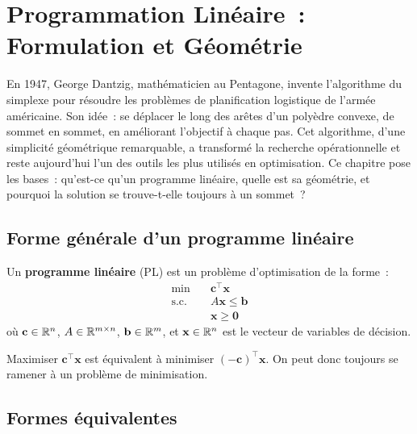 \chapter{Programmation Lin\'eaire~: Formulation et G\'eom\'etrie}
\label{ch:programmation_lineaire}

En 1947, George Dantzig, math\'ematicien au Pentagone, invente l'algorithme
du simplexe pour r\'esoudre les probl\`emes de planification logistique de
l'arm\'ee am\'ericaine. Son id\'ee~: se d\'eplacer le long des ar\^etes d'un
poly\`edre convexe, de sommet en sommet, en am\'eliorant l'objectif \`a chaque
pas. Cet algorithme, d'une simplicit\'e g\'eom\'etrique remarquable, a
transform\'e la recherche op\'erationnelle et reste aujourd'hui l'un des
outils les plus utilis\'es en optimisation. Ce chapitre pose les bases~:
qu'est-ce qu'un programme lin\'eaire, quelle est sa g\'eom\'etrie, et pourquoi
la solution se trouve-t-elle toujours \`a un sommet~?

\section{Forme g\'en\'erale d'un programme lin\'eaire}

\begin{definition}
Un \textbf{programme lin\'eaire} (PL) est un probl\`eme d'optimisation de la
forme~:
\[
\begin{aligned}
  \min \quad & \mathbf{c}^\top \mathbf{x} \\
  \text{s.c.} \quad
    & A\mathbf{x} \le \mathbf{b} \\
    & \mathbf{x} \ge \mathbf{0}
\end{aligned}
\]
o\`u $\mathbf{c} \in \mathbb{R}^n$, $A \in \mathbb{R}^{m \times n}$, $\mathbf{b} \in \mathbb{R}^m$,
et $\mathbf{x} \in \mathbb{R}^n$ est le vecteur de variables de d\'ecision.
\end{definition}

\begin{remarque}
Maximiser $\mathbf{c}^\top \mathbf{x}$ est \'equivalent \`a minimiser
$(-\mathbf{c})^\top \mathbf{x}$.  On peut donc toujours se ramener \`a un
probl\`eme de minimisation.
\end{remarque}

\section{Formes \'equivalentes}

